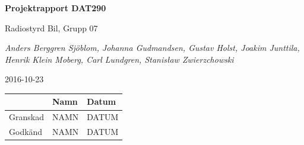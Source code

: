 \documentclass[a4paper]{article}
\begin{document}
\begin{titlepage}
\centering
{\bfseries\huge Projektrapport DAT290}

\vspace{10mm}

{\Large Radiostyrd Bil, Grupp 07}

\vspace{20mm}

{\Large \itshape{Anders Berggren Sjöblom, Johanna Gudmandsen, Gustav Holst, Joakim Junttila, Henrik Klein Moberg, Carl Lundgren, Stanisław Zwierzchowski}}

\vspace{10mm}

{2016-10-23}


\normalsize{
\begin{table}[b]
\centering
\begin{tabular}{|l|l|l|}  \hline
        & \bf Namn & \bf Datum   \\ \hline \hline
Granskad & NAMN     & DATUM        \\ \hline
Godkänd  & NAMN     & DATUM         \\ \hline
\end{tabular}
\end{table}}
\end{titlepage}

\tableofcontents
\end{document}
